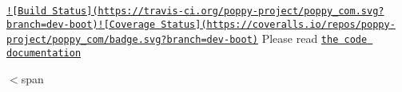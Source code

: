 \href{https://travis-ci.org/poppy-project/poppy_com}{\tt !\mbox{[}Build Status\mbox{]}(https\-://travis-\/ci.\-org/poppy-\/project/poppy\-\_\-com.\-svg?branch=dev-\/boot)}\href{https://coveralls.io/github/poppy-project/poppy_com?branch=dev-boot}{\tt !\mbox{[}Coverage Status\mbox{]}(https\-://coveralls.\-io/repos/poppy-\/project/poppy\-\_\-com/badge.\-svg?branch=dev-\/boot)} Please read \href{http://poppy-project.github.io/poppy_com/}{\tt the code documentation}

$<$span 